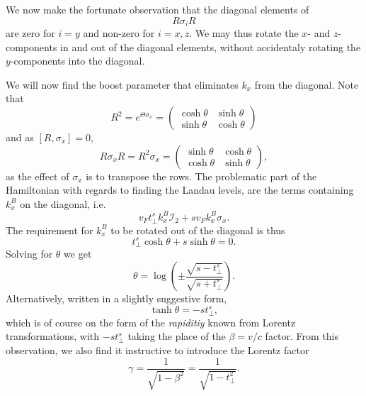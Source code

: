 We now make the fortunate observation that the diagonal elements of
\[
  R \sigma_{i} R
\]
are zero for $i=y$ and non-zero for \(i=x,z\).
We may thus rotate the \(x\)- and \(z\)-components in and out of the diagonal elements, without accidentaly rotating the \(y\)-components into the diagonal.

We will now find the boost parameter that eliminates \(k_{x}\) from the diagonal.
Note that
\begin{equation}
  \label{eq:33}
  R^{2} = e^{\Theta \sigma _{x} } =
  \begin{pmatrix}
    \cosh \theta & \sinh \theta \\
    \sinh \theta & \cosh \theta
  \end{pmatrix}
\end{equation}
and as $[R, \sigma_{x}] = 0$,
\begin{equation}
  \label{eq:34}
  R \sigma _{x} R =  R^{2} \sigma _{x} =
  \begin{pmatrix}
    \sinh \theta & \cosh \theta \\
    \cosh \theta & \sinh \theta
  \end{pmatrix},
\end{equation}
as the effect of \(\sigma _{x}\) is to transpose the rows.
The problematic part of the Hamiltonian with regards to finding the Landau levels, are the terms containing \(k^B_{x}\) on the diagonal, i.e.
\[
  v_F t^s_{\perp} k^B_{x} \mathcal{I}_{2} + s v_{F} k^B_{x} \sigma _{x}.
\]
The requirement for \(k^B_{x}\) to be rotated out of the diagonal is thus
\begin{equation}
  \label{eq:35}
  t^s_{\perp} \cosh \theta + s \sinh \theta = 0.
\end{equation}
Solving for \(\theta \) we get
\begin{equation}
  \label{eq:36}
  \theta = \log (
  \pm \frac{\sqrt{s - t^s_{\perp}}}{\sqrt{s + t^s_{\perp}}}
  ).
\end{equation}
Alternatively, written in a slightly suggestive form,
\begin{equation}
  \label{eq:37}
  \tanh \theta =
  - s t^s_{\perp},
\end{equation}
which is of course on the form of the \emph{rapiditiy} known from Lorentz transformations, with \( -s t^{s}_{\perp} \) taking the place of the \( \beta = v / c \) factor.
From this observation, we also find it instructive to introduce the Lorentz factor
\begin{equation}
  \label{eq:gamma-lorentz}
  \gamma = \frac{1}{\sqrt{1 - \beta^2} } = \frac{1}{\sqrt{ 1 - t_{\perp}^2 }}.
\end{equation}

